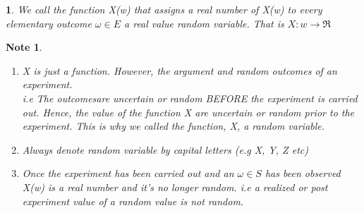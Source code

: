 \documentclass[11pt]{article}
\newtheorem*{note}{Note}
\newtheorem{definition}{\framebox{DEF}}[section]
\newcommand\tab[1][1cm]{\hspace*{#1}}
\begin{document}
            \begin{definition}
                We call the function X(w) that assigns a real number of X(w) to every elementary outcome $\omega \in E$ a real value random variable. 
                That is $X: w \rightarrow \Re$
            \end{definition}
            \begin{note} \tab 
                \begin{enumerate}
                    \item X is just a function. However, the argument and random outcomes of an experiment. \\
                            i.e The outcomesare uncertain or random BEFORE the experiment is carried out. 
                            Hence, the value of the function X are uncertain or random prior to the experiment. 
                            This is why we called the function, X, a random variable.
                    \item Always denote random variable by capital letters (e.g X, Y, Z etc)
                    \item Once the experiment has been carried out and an $\omega \in S$ has been observed X(w) is a real number and 
                            it's no longer random. i.e a realized or post experiment value of a random value is not random.\\
                \end{enumerate}
            \end{note}
\end{document}
